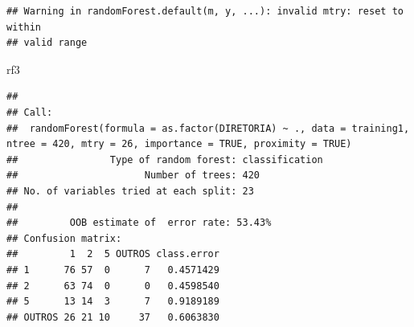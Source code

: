 \documentclass[]{article}
\newenvironment{Shaded}{\begin{snugshade}}{\end{snugshade}}
\newcommand{\CommentTok}[1]{\textcolor[rgb]{0.56,0.35,0.01}{\textit{#1}}}
\newcommand{\DataTypeTok}[1]{\textcolor[rgb]{0.13,0.29,0.53}{#1}}
\newcommand{\DecValTok}[1]{\textcolor[rgb]{0.00,0.00,0.81}{#1}}
\newcommand{\KeywordTok}[1]{\textcolor[rgb]{0.13,0.29,0.53}{\textbf{#1}}}
\newcommand{\NormalTok}[1]{#1}
\newcommand{\OperatorTok}[1]{\textcolor[rgb]{0.81,0.36,0.00}{\textbf{#1}}}
\newcommand{\OtherTok}[1]{\textcolor[rgb]{0.56,0.35,0.01}{#1}}
\newcommand{\StringTok}[1]{\textcolor[rgb]{0.31,0.60,0.02}{#1}}
\begin{document}
\begin{Shaded}
\end{Shaded}

\begin{Shaded}
\end{Shaded}

\begin{verbatim}
## Warning in randomForest.default(m, y, ...): invalid mtry: reset to within
## valid range
\end{verbatim}

\begin{Shaded}
\begin{Highlighting}[]
\NormalTok{rf3}
\end{Highlighting}
\end{Shaded}

\begin{verbatim}
## 
## Call:
##  randomForest(formula = as.factor(DIRETORIA) ~ ., data = training1,      ntree = 420, mtry = 26, importance = TRUE, proximity = TRUE) 
##                Type of random forest: classification
##                      Number of trees: 420
## No. of variables tried at each split: 23
## 
##         OOB estimate of  error rate: 53.43%
## Confusion matrix:
##         1  2  5 OUTROS class.error
## 1      76 57  0      7   0.4571429
## 2      63 74  0      0   0.4598540
## 5      13 14  3      7   0.9189189
## OUTROS 26 21 10     37   0.6063830
\end{verbatim}
\end{document}
